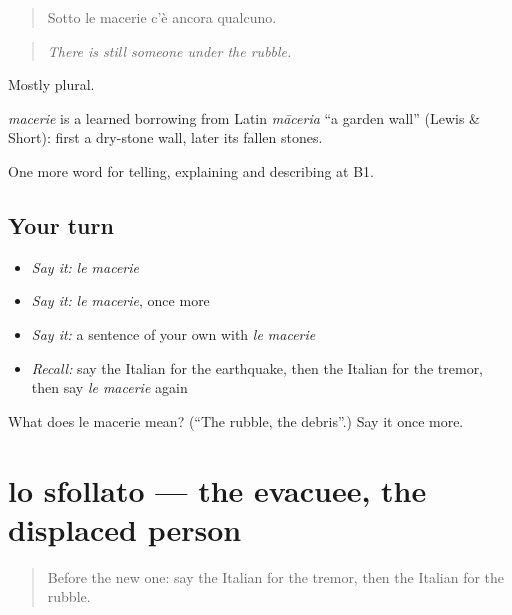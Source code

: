 \begin{quote}
Sotto le macerie c'è ancora qualcuno.
\end{quote}

\begin{quote}
\emph{There is still someone under the rubble.}
\end{quote}

Mostly plural.

\begin{cousinweb}
\emph{macerie} is a learned borrowing from Latin \emph{māceria} \textquotedblleft{}a garden wall\textquotedblright{} (Lewis \& Short): first a dry-stone wall, later its fallen stones.
\end{cousinweb}

\begin{grammarlens}[title={What you've built}]
One more word for telling, explaining and describing at B1.
\end{grammarlens}

\subsection*{Your turn}
\begin{itemize}
\raggedright
  \item \emph{Say it:} \emph{le macerie}
  \item \emph{Say it:} \emph{le macerie}, once more
  \item \emph{Say it:} a sentence of your own with \emph{le macerie}
  \item \emph{Recall:} say the Italian for the earthquake, then the Italian for the tremor, then say \emph{le macerie} again
\end{itemize}

\begin{tcolorbox}[breakable,colback=teal!4,colframe=teal!35!black,title={Before you move on}]
What does le macerie mean? (\textquotedblleft{}The rubble, the debris\textquotedblright{}.) Say it once more.
\end{tcolorbox}
\section[lo sfollato]{lo sfollato — the evacuee, the displaced person}

\label{lesson:IT-C304-sfollato}



\begin{quote}
Before the new one: say the Italian for the tremor, then the Italian for the rubble.
\end{quote}

